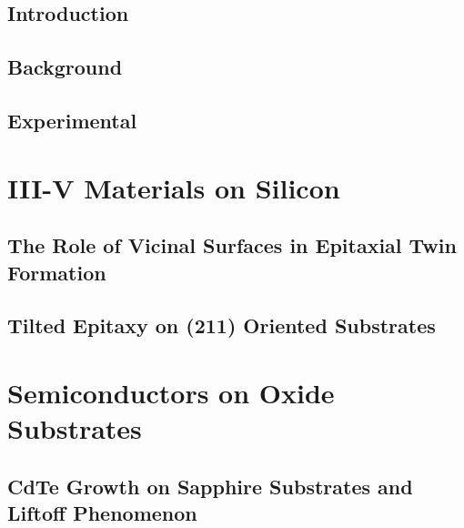 \documentclass[letterpaper,12pt,twoside]{report}
\begin{document}
	\pagestyle{fancy}
	\fancyhead{}
	\fancyfoot{}
	\fancyfoot[CE,CO]{\thepage}
    
    \lstset{%
basicstyle=\footnotesize\ttfamily,
breaklines=true,
tabsize=2,
frame=single
}



\chapter{Introduction}


\chapter{Background}


\chapter{Experimental}


\part{III-V Materials on Silicon}
\chapter{The Role of Vicinal Surfaces in Epitaxial Twin Formation}


\chapter{Tilted Epitaxy on (211) Oriented Substrates}


\part{Semiconductors on Oxide Substrates}
\chapter{CdTe Growth on Sapphire Substrates and Liftoff Phenomenon}

\end{document}
